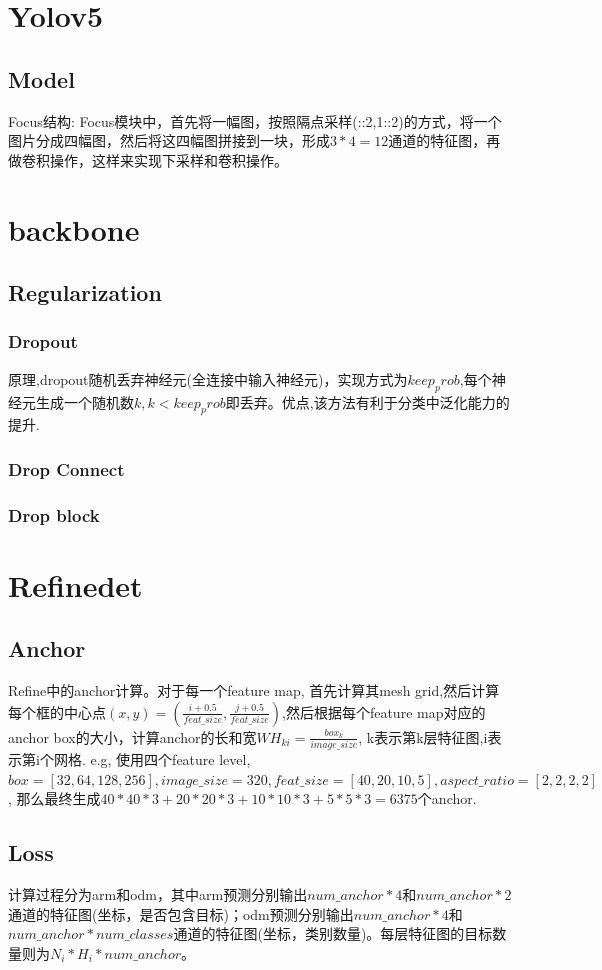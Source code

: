 \documentclass{article}
\begin{document}
\section{Yolov5}
\subsection{Model}
Focus结构: Focus模块中，首先将一幅图，按照隔点采样(::2,1::2)的方式，将一个图片分成四幅图，然后将这四幅图拼接到一块，形成$3*4=12$通道的特征图，再做卷积操作，这样来实现下采样和卷积操作。

\section{backbone}
\subsection{Regularization}
\subsubsection{Dropout}
原理,dropout随机丢弃神经元(全连接中输入神经元)，实现方式为$keep_prob$,每个神经元生成一个随机数$k,k<keep_prob$即丢弃。优点,该方法有利于分类中泛化能力的提升.
\subsubsection{Drop Connect}
\subsubsection{Drop block}


\section{Refinedet}
\subsection{Anchor}
Refine中的anchor计算。对于每一个feature map, 首先计算其mesh grid,然后计算每个框的中心点$(x,y)=(\frac{i+0.5}{feat\_size},\frac{j+0.5}{feat\_size})$,然后根据每个feature map对应的anchor box的大小，计算anchor的长和宽$WH_{ki}=\frac{box_k}{image\_size}$, k表示第k层特征图,i表示第i个网格. e.g, 使用四个feature level, $box=[32,64,128,256], image\_size=320, feat\_size=[40,20,10,5], aspect\_ ratio=[2,2,2,2]$, 那么最终生成$40*40*3+20*20*3+10*10*3+5*5*3=6375$个anchor.

\subsection{Loss}
计算过程分为arm和odm，其中arm预测分别输出$num\_anchor*4$和$num\_anchor*2$通道的特征图(坐标，是否包含目标)；odm预测分别输出$num\_anchor*4$和$num\_anchor*num\_classes$通道的特征图(坐标，类别数量)。每层特征图的目标数量则为$N_i*H_i*num\_anchor$。
\end{document}
